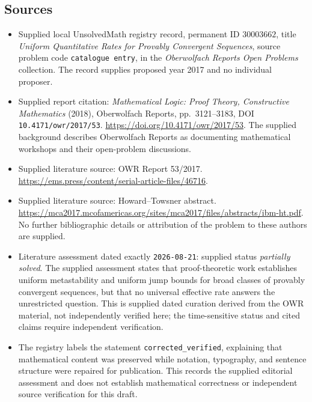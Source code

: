 \documentclass[11pt]{article}
\begin{document}
\subsection{Sources}
\begin{itemize}
\item Supplied local UnsolvedMath registry record, permanent ID \(30003662\), title \emph{Uniform Quantitative Rates for Provably Convergent Sequences}, source problem code \texttt{catalogue entry}, in the \emph{Oberwolfach Reports Open Problems} collection. The record supplies proposed year 2017 and no individual proposer.
\item Supplied report citation: \emph{Mathematical Logic: Proof Theory, Constructive Mathematics} (2018), Oberwolfach Reports, pp.\ 3121--3183, DOI \texttt{10.4171/owr/2017/53}. \url{https://doi.org/10.4171/owr/2017/53}. The supplied background describes Oberwolfach Reports as documenting mathematical workshops and their open-problem discussions.
\item Supplied literature source: OWR Report 53/2017. \url{https://ems.press/content/serial-article-files/46716}.
\item Supplied literature source: Howard--Towsner abstract. \url{https://mca2017.mcofamericas.org/sites/mca2017/files/abstracts/ibm-ht.pdf}. No further bibliographic details or attribution of the problem to these authors are supplied.
\item Literature assessment dated exactly \texttt{2026-08-21}: supplied status \emph{partially solved}. The supplied assessment states that proof-theoretic work establishes uniform metastability and uniform jump bounds for broad classes of provably convergent sequences, but that no universal effective rate answers the unrestricted question. This is supplied dated curation derived from the OWR material, not independently verified here; the time-sensitive status and cited claims require independent verification.
\item The registry labels the statement \texttt{corrected\_verified}, explaining that mathematical content was preserved while notation, typography, and sentence structure were repaired for publication. This records the supplied editorial assessment and does not establish mathematical correctness or independent source verification for this draft.
\end{itemize}
\end{document}
